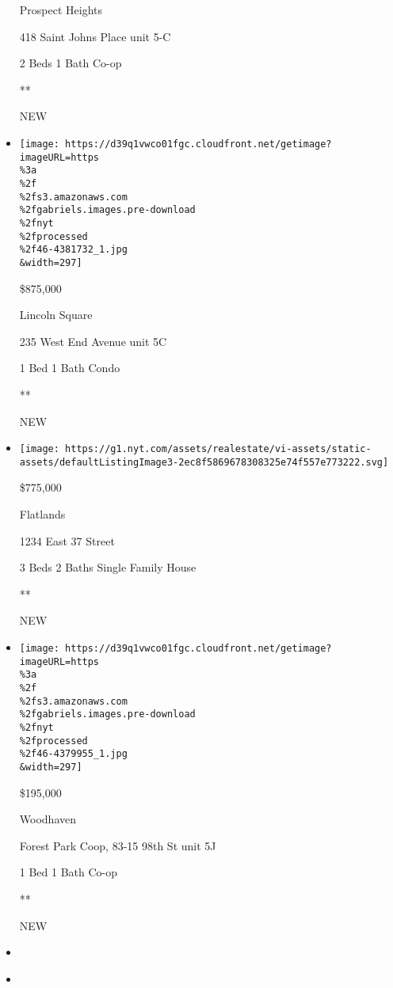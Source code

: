 \begin{itemize}
  Prospect Heights

  418 Saint Johns Place unit 5-C

  2 Beds \textbar{} 1 Bath \textbar{} Co-op

  **

  NEW
\item
  \href{/real-estate/usa/ny/new-york/lincoln-square/homes-for-sale/235-west-end-avenue/46-4381732?}{}

  \texttt{[image: https://d39q1vwco01fgc.cloudfront.net/getimage?imageURL=https\\\%3a\\\%2f\\\%2fs3.amazonaws.com\\\%2fgabriels.images.pre-download\\\%2fnyt\\\%2fprocessed\\\%2f46-4381732\_1.jpg\\\&width=297]}

  \$875,000

  Lincoln Square

  235 West End Avenue unit 5C

  1 Bed \textbar{} 1 Bath \textbar{} Condo

  **

  NEW
\item
  \href{/real-estate/usa/ny/brooklyn/flatlands/homes-for-sale/1234-east-37-street/15055-5535909?}{}

  \texttt{[image: https://g1.nyt.com/assets/realestate/vi-assets/static-assets/defaultListingImage3-2ec8f5869678308325e74f557e773222.svg]}

  \$775,000

  Flatlands

  1234 East 37 Street

  3 Beds \textbar{} 2 Baths \textbar{} Single Family House

  **

  NEW
\item
  \href{/real-estate/usa/ny/queens/woodhaven/homes-for-sale/forest-park-coop-83-15-98th-st/46-4379955?}{}

  \texttt{[image: https://d39q1vwco01fgc.cloudfront.net/getimage?imageURL=https\\\%3a\\\%2f\\\%2fs3.amazonaws.com\\\%2fgabriels.images.pre-download\\\%2fnyt\\\%2fprocessed\\\%2f46-4379955\_1.jpg\\\&width=297]}

  \$195,000

  Woodhaven

  Forest Park Coop, 83-15 98th St unit 5J

  1 Bed \textbar{} 1 Bath \textbar{} Co-op

  **

  NEW
\item
\item
  \href{/real-estate/usa/ny/new-york/harlem/homes-for-sale/102-west-123rd-street/12436-OLRS-0048859?}{}


\end{itemize}
